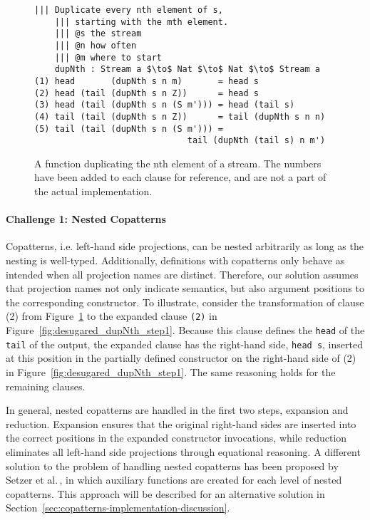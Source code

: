\begin{figure}[H]
\begin{lstlisting}[mathescape]
    ||| Duplicate every nth element of s, 
    ||| starting with the mth element.
    ||| @s the stream
    ||| @n how often
    ||| @m where to start
    dupNth : Stream a $\to$ Nat $\to$ Nat $\to$ Stream a
(1) head       (dupNth s n m)       = head s
(2) head (tail (dupNth s n Z))      = head s
(3) head (tail (dupNth s n (S m'))) = head (tail s)
(4) tail (tail (dupNth s n Z))      = tail (dupNth s n n)
(5) tail (tail (dupNth s n (S m'))) = 
                              tail (dupNth (tail s) n m')
\end{lstlisting}
  \caption{A function duplicating the nth element of a stream. The numbers have been
  added to each clause for reference, and are not a part of the actual implementation.}
  \label{fig:dupNth}
\end{figure}

\paragraph{Challenge 1: Nested Copatterns}
Copatterns, i.e. left-hand side projections, can be nested arbitrarily as long
as the nesting is well-typed. Additionally, definitions with copatterns only behave
as intended when all projection names are distinct. Therefore, our solution
assumes that projection names not only indicate semantics, but also argument
positions to the corresponding constructor. To illustrate, consider the
transformation of clause (2) from Figure~\ref{fig:dupNth} to the expanded clause
\texttt{(2)} in Figure~\ref{fig:desugared_dupNth_step1}. Because this clause
defines the \texttt{head} of the \texttt{tail} of the output, the expanded
clause has the right-hand side, \texttt{head~s}, inserted at this position in
the partially defined constructor on the right-hand side of (2) in
Figure~\ref{fig:desugared_dupNth_step1}. The same reasoning holds for the remaining clauses.

In general, nested copatterns are handled in the first two steps, expansion and
reduction. Expansion ensures that the original right-hand sides are inserted
into the correct positions in the expanded constructor invocations, while
reduction eliminates all left-hand side projections through equational
reasoning. A different solution to the problem of handling nested copatterns has
been proposed by Setzer et al.\,\citep{Setzer14Unnesting}, in which auxiliary
functions are created for each level of nested copatterns. This approach will be
described for an alternative solution in
Section~\ref{sec:copatterns-implementation-discussion}.

